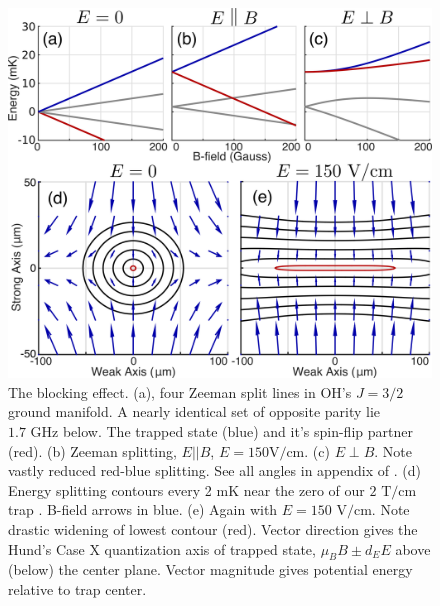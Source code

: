 \documentclass[%
 reprint,
groupedaddress,
 amsmath,amssymb,
 aps,
prl,
]{revtex4-1}
\newcommand{\epb}{$E\!\perp\!B$}
\begin{document}
\begin{figure}[tb]
\includegraphics[width=\linewidth]{Blocking/blocking.png}%
\caption{
The blocking effect. (a), four Zeeman split lines in OH's $J=3/2$ ground manifold. A nearly identical set of opposite parity lie $1.7\text{ GHz}$ below. The trapped state (blue) and it's spin-flip partner (red). (b) Zeeman splitting, $E||B$, $E=150\text{V/cm}$. (c) \epb. Note vastly reduced red-blue splitting. See all angles in appendix of \cite{Stuhl2013}. (d) Energy splitting contours every 2 mK near the zero of our $2\text{ T/cm}$ trap \cite{Stuhl2012uwave}. B-field arrows in blue. (e) Again with $E=150\text{ V/cm}$. Note drastic widening of lowest contour (red). Vector direction gives the Hund's Case X quantization axis of trapped state, $\mu_BB\pm d_EE$ above (below) the center plane. Vector magnitude gives potential energy relative to trap center.
\label{fig:blocking}}
\end{figure}

\end{document}
